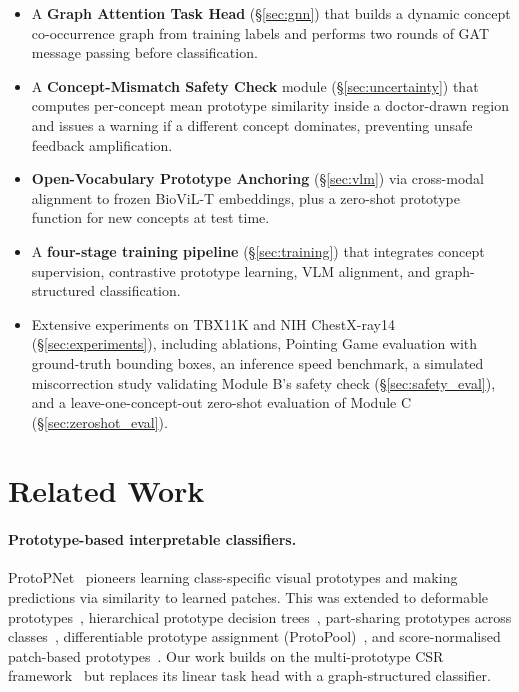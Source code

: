 \documentclass{article}
\begin{document}
\begin{itemize}
    \item A \textbf{Graph Attention Task Head} (§\ref{sec:gnn}) that builds a dynamic concept co-occurrence graph from training labels and performs two rounds of GAT message passing before classification.
    \item A \textbf{Concept-Mismatch Safety Check} module (§\ref{sec:uncertainty}) that computes per-concept mean prototype similarity inside a doctor-drawn region and issues a warning if a different concept dominates, preventing unsafe feedback amplification.
    \item \textbf{Open-Vocabulary Prototype Anchoring} (§\ref{sec:vlm}) via cross-modal alignment to frozen BioViL-T embeddings, plus a zero-shot prototype function for new concepts at test time.
    \item A \textbf{four-stage training pipeline} (§\ref{sec:training}) that integrates concept supervision, contrastive prototype learning, VLM alignment, and graph-structured classification.
    \item Extensive experiments on TBX11K and NIH ChestX-ray14 (§\ref{sec:experiments}), including ablations, Pointing Game evaluation with ground-truth bounding boxes, an inference speed benchmark, a simulated miscorrection study validating Module B's safety check (§\ref{sec:safety_eval}), and a leave-one-concept-out zero-shot evaluation of Module C (§\ref{sec:zeroshot_eval}).
\end{itemize}

\section{Related Work}
\label{sec:related}

\paragraph{Prototype-based interpretable classifiers.}
ProtoPNet~\cite{chen2019looks} pioneers learning class-specific visual prototypes and making predictions via similarity to learned patches.
This was extended to deformable prototypes~\cite{donnelly2022deformable}, hierarchical prototype decision trees~\cite{nauta2021prototree}, part-sharing prototypes across classes~\cite{rymarczyk2021protopshare}, differentiable prototype assignment (ProtoPool)~\cite{rymarczyk2022protopool}, and score-normalised patch-based prototypes~\cite{nauta2023pipnet}.
Our work builds on the multi-prototype CSR framework~\cite{csr2025} but replaces its linear task head with a graph-structured classifier.
\end{document}
